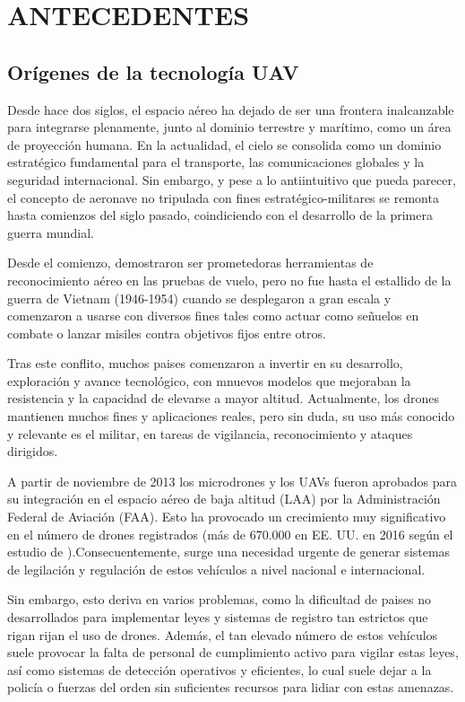    \chapter{ANTECEDENTES}

    \section{Orígenes de la tecnología UAV}

    Desde hace dos siglos, el espacio aéreo ha dejado de ser una frontera
    inalcanzable para integrarse plenamente, junto al dominio terrestre y marítimo, 
    como un área de proyección humana. En la actualidad, el cielo se consolida como 
    un dominio estratégico fundamental para el transporte, las comunicaciones globales 
    y la seguridad internacional. Sin embargo, y pese a lo antiintuitivo que pueda 
    parecer, el concepto de aeronave no tripulada con fines estratégico-militares se 
    remonta hasta comienzos del siglo pasado, coindiciendo con el desarrollo de la primera
    guerra mundial.

    Desde el comienzo, demostraron ser prometedoras herramientas de reconocimiento aéreo
    en las pruebas de vuelo, pero no fue hasta el estallido de la guerra de Vietnam (1946-1954)
    cuando se desplegaron a gran escala y comenzaron a usarse con diversos fines tales como actuar como señuelos en combate o lanzar misiles contra objetivos fijos entre otros. 

    Tras este conflito, muchos paises comenzaron a invertir en su desarrollo, exploración y avance tecnológico, con mnuevos modelos que mejoraban la resistencia y la capacidad de elevarse a mayor altitud. Actualmente, los drones mantienen muchos fines y aplicaciones reales, pero sin duda, su uso más conocido y relevante es el militar, en tareas de vigilancia, reconocimiento y ataques dirigidos.

    A partir de noviembre de 2013 los microdrones y los UAVs fueron 
    aprobados para su integración en el espacio aéreo de baja altitud (LAA)
    por la Administración Federal de Aviación (FAA). Esto ha provocado 
    un crecimiento muy significativo en el número de drones registrados 
    (más de 670.000 en EE. UU. en 2016 según el estudio de \cite{micro_drone_radar_studio}).Consecuentemente, surge una necesidad
    urgente de generar sistemas de legilación y regulación de estos vehículos a
        nivel nacional e internacional. 

    Sin embargo, esto deriva en varios problemas, como la dificultad de paises no desarrollados para implementar leyes y sistemas de registro tan estrictos que rigan rijan el uso de drones. Además, el tan elevado número de estos vehículos suele provocar la falta de personal de cumplimiento activo para vigilar estas leyes, así como sistemas de detección operativos y eficientes, lo cual suele dejar a la policía o fuerzas del orden sin suficientes recursos para lidiar con estas amenazas. 

